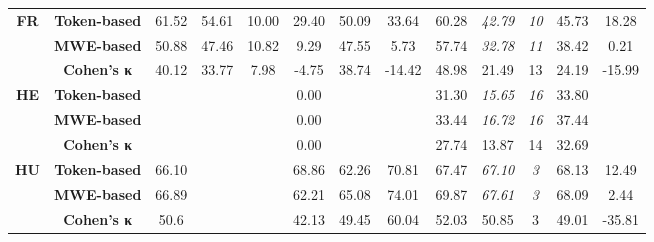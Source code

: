 \documentclass[output=paper,modfonts,nonflat,draftmode]{langsci/langscibook}
\begin{document}
\begin{table}
{\begin{tabular}{ccccccccccccc}
\textbf{\scriptsize{}FR} & \textbf{\scriptsize{}Token-based} & {\scriptsize{}61.52} & {\scriptsize{}54.61} & {\scriptsize{}10.00} & {\scriptsize{}29.40} & {\scriptsize{}50.09} & {\scriptsize{}33.64} & {\scriptsize{}60.28} & \emph{\scriptsize{}42.79} & \textit{\scriptsize{}10} & {\scriptsize{}45.73} & {\scriptsize{}18.28}\tabularnewline
 & \textbf{\scriptsize{}MWE-based} & {\scriptsize{}50.88} & {\scriptsize{}47.46} & {\scriptsize{}10.82} & {\scriptsize{}9.29} & {\scriptsize{}47.55} & {\scriptsize{}5.73} & {\scriptsize{}57.74} & \emph{\scriptsize{}32.78} & \textit{\scriptsize{}11} & {\scriptsize{}38.42} & {\scriptsize{}0.21}\tabularnewline
   & \textbf{\scriptsize{}Cohen's κ} &\scriptsize{40.12}&\scriptsize{33.77}  &\scriptsize{7.98}  & \scriptsize{-4.75} &\scriptsize{38.74}  &\scriptsize{-14.42}  &\scriptsize{48.98} &\scriptsize{21.49}  &\scriptsize{13} & \scriptsize{24.19} &\scriptsize{-15.99}  \tabularnewline
\midrule 

\textbf{\scriptsize{}HE} & \textbf{\scriptsize{}Token-based} &  &  &  & {\scriptsize{}0.00} &  &  & {\scriptsize{}31.30} & \emph{\scriptsize{}15.65} & \textit{\scriptsize{}16} & {\scriptsize{}33.80} & \tabularnewline
 & \textbf{\scriptsize{}MWE-based} &  &  &  & {\scriptsize{}0.00} &  &  & {\scriptsize{}33.44} & \emph{\scriptsize{}16.72} & \textit{\scriptsize{}16} & {\scriptsize{}37.44} & \tabularnewline
   & \textbf{\scriptsize{}Cohen's κ} &\scriptsize{}  &\scriptsize{}  &\scriptsize{}  & \scriptsize{0.00} &\scriptsize{}  &\scriptsize{}  &\scriptsize{27.74} &\scriptsize{13.87}  &\scriptsize{14} & \scriptsize{32.69} &\scriptsize{}  \tabularnewline
\midrule 

\textbf{\scriptsize{}HU} & \textbf{\scriptsize{}Token-based} & {\scriptsize{}66.10} &  &  & {\scriptsize{}68.86} & {\scriptsize{}62.26} & {\scriptsize{}70.81} & {\scriptsize{}67.47} & \emph{\scriptsize{}67.10} & \textit{\scriptsize{}3} & {\scriptsize{}68.13} & {\scriptsize{}12.49}\tabularnewline
 & \textbf{\scriptsize{}MWE-based} & {\scriptsize{}66.89} &  &  & {\scriptsize{}62.21} & {\scriptsize{}65.08} & {\scriptsize{}74.01} & {\scriptsize{}69.87} & \emph{\scriptsize{}67.61} & \textit{\scriptsize{}3} & {\scriptsize{}68.09} & {\scriptsize{}2.44}\tabularnewline
   & \textbf{\scriptsize{}Cohen's κ} &\scriptsize{50.6}  &\scriptsize{}  &\scriptsize{}  & \scriptsize{42.13} &\scriptsize{49.45}  &\scriptsize{60.04}  &\scriptsize{52.03} &\scriptsize{50.85}  &\scriptsize{3} & \scriptsize{49.01} &\scriptsize{-35.81} \tabularnewline
\midrule 


\end{tabular}}
\end{table}
\end{document}
